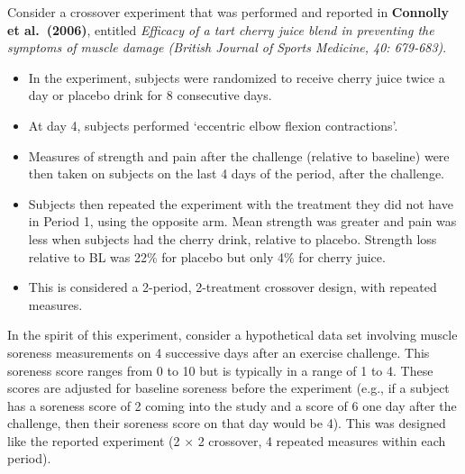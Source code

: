 \documentclass[
  9pt,
  ignorenonframetext,
]{beamer}
\begin{document}
\begin{frame}{}
\protect\hypertarget{section-6}{}
Consider a crossover experiment that was performed and reported in
\textbf{Connolly et al.~(2006)}, entitled \emph{Efficacy of a tart
cherry juice blend in preventing the symptoms of muscle damage (British
Journal of Sports Medicine, 40: 679-683)}.

\begin{itemize}
\item
  In the experiment, subjects were randomized to receive cherry juice
  twice a day or placebo drink for 8 consecutive days.
\item
  At day 4, subjects performed `eccentric elbow flexion contractions'.
\item
  Measures of strength and pain after the challenge (relative to
  baseline) were then taken on subjects on the last 4 days of the
  period, after the challenge.
\item
  Subjects then repeated the experiment with the treatment they did not
  have in Period 1, using the opposite arm. Mean strength was greater
  and pain was less when subjects had the cherry drink, relative to
  placebo. Strength loss relative to BL was 22\% for placebo but only
  4\% for cherry juice.
\item
  This is considered a 2-period, 2-treatment crossover design, with
  repeated measures.
\end{itemize}
\end{frame}

\begin{frame}{}
\protect\hypertarget{section-7}{}
In the spirit of this experiment, consider a hypothetical data set
involving muscle soreness measurements on 4 successive days after an
exercise challenge. This soreness score ranges from 0 to 10 but is
typically in a range of 1 to 4. These scores are adjusted for baseline
soreness before the experiment (e.g., if a subject has a soreness score
of 2 coming into the study and a score of 6 one day after the challenge,
then their soreness score on that day would be 4). This was designed
like the reported experiment (2 \(\times\) 2 crossover, 4 repeated
measures within each period).
\end{frame}
\end{document}
